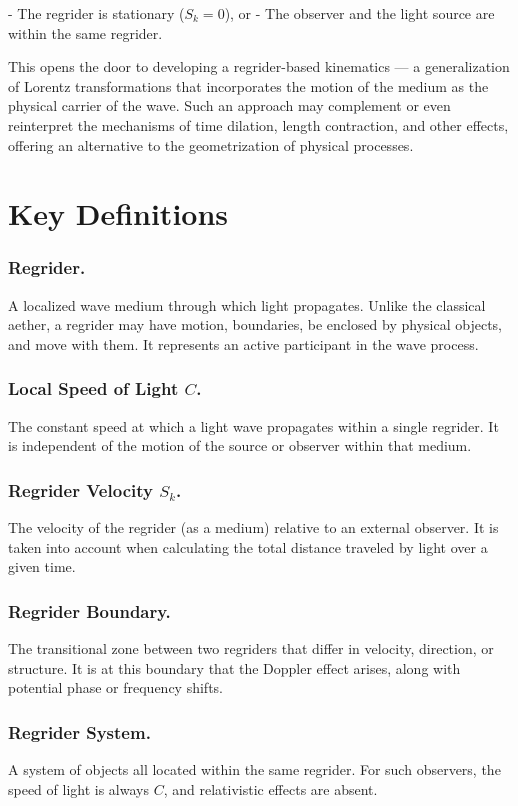 \documentclass[12pt]{article}
\begin{document}
- The regrider is stationary ($S_k = 0$), or
- The observer and the light source are within the same regrider.

This opens the door to developing a regrider-based kinematics — a generalization of Lorentz transformations that incorporates the motion of the medium as the physical carrier of the wave. Such an approach may complement or even reinterpret the mechanisms of time dilation, length contraction, and other effects, offering an alternative to the geometrization of physical processes.

\section*{Key Definitions}

\subsubsection*{Regrider.}
A localized wave medium through which light propagates. Unlike the classical aether, a regrider may have motion, boundaries, be enclosed by physical objects, and move with them. It represents an active participant in the wave process.

\subsubsection*{Local Speed of Light $C$.}
The constant speed at which a light wave propagates within a single regrider. It is independent of the motion of the source or observer within that medium.

\subsubsection*{Regrider Velocity $S_k$.}
The velocity of the regrider (as a medium) relative to an external observer. It is taken into account when calculating the total distance traveled by light over a given time.

\subsubsection*{Regrider Boundary.}
The transitional zone between two regriders that differ in velocity, direction, or structure. It is at this boundary that the Doppler effect arises, along with potential phase or frequency shifts.

\subsubsection*{Regrider System.}
A system of objects all located within the same regrider. For such observers, the speed of light is always $C$, and relativistic effects are absent.
\end{document}
